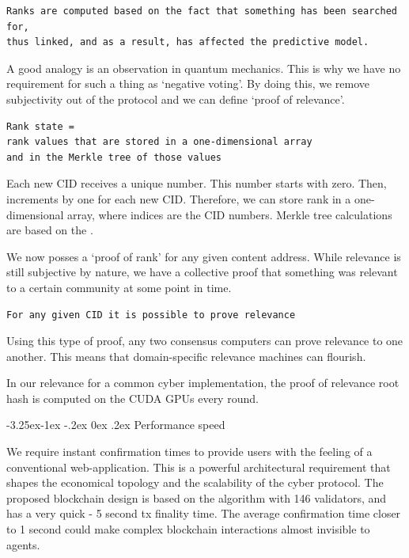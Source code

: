 \documentclass[8pt,oneside]{amsart}
\makeatletter
\newcommand{\linkgreen}[2]{\href{#1}{\color{green}{#2}}}
\renewcommand\subsection{\@startsection{subsection}{2}{\z@}%
                                     {-3.25ex\@plus -1ex \@minus -.2ex}%
                                     {0ex \@plus .2ex}%
                                     {\play\Large}}%
\newcommand{\titleSection}[1]{\subsection{#1}}
\newcommand{\code}[1]{{\PlayBold #1}}
\makeatother
\begin{document}
\begin{Abstract}
\begin{lstlisting}
Ranks are computed based on the fact that something has been searched for,
thus linked, and as a result, has affected the predictive model.
\end{lstlisting}

A good analogy is an observation in quantum mechanics. This is why we have no requirement for such a thing as ‘negative voting’. By doing this, we remove subjectivity out of the protocol and we can define ‘proof of relevance’.

\begin{lstlisting}
Rank state =
rank values that are stored in a one-dimensional array
and in the Merkle tree of those values
\end{lstlisting}

Each new CID receives a unique number. This number starts with zero. Then, increments by one for each new CID. Therefore, we can store rank in a one-dimensional array, where indices are the CID numbers. Merkle tree calculations are based on the \linkgreen{https://tools.ietf.org/html/rfc6962#section-2.1}{RFC-6962 standard}.

We now posses a ‘proof of rank’ for any given content address. While relevance is still subjective by nature, we have a collective proof that something was relevant to a certain community at some point in time.

\begin{lstlisting}
For any given CID it is possible to prove relevance
\end{lstlisting}

Using this type of proof, any two \linkgreen{https://ipfs.io/ipfs/QmdCeixQUHBjGnKfwbB1dxf4X8xnadL8xWmmEnQah5n7x2}{IBC compatible} consensus computers can prove relevance to one another. This means that domain-specific relevance machines can flourish.

In our relevance for a common \code{cyber} implementation, the proof of relevance root hash is computed on the CUDA GPUs every round.

\titleSection{Performance speed}\label{Performance speed}

We require instant confirmation times to provide users with the feeling of a conventional web-application. This is a powerful architectural requirement that shapes the economical topology and the scalability of the cyber protocol. The proposed blockchain design is based on the \linkgreen{https://ipfs.io/ipfs/QmaMtD7xDgghqgjN62zWZ5TBGFiEjGQtuZBjJ9sMh816KJ}{Tendermint consensus} algorithm with 146 validators, and has a very quick - 5 second tx finality time. The average confirmation time closer to 1 second could make complex blockchain interactions almost invisible to agents.


\end{Abstract}
\end{document}
